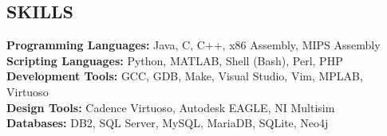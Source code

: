 \documentclass[line,margin]{res}
\begin{document}
\begin{resume}
		\section{SKILLS}
		\textbf{Programming Languages:} Java, C, C++, x86 Assembly, MIPS Assembly\\
		\textbf{Scripting Languages:} Python, MATLAB, Shell (Bash), Perl, PHP\\
		\textbf{Development Tools:} GCC, GDB, Make, Visual Studio, Vim, MPLAB, Virtuoso\\
		\textbf{Design Tools:} Cadence Virtuoso, Autodesk  EAGLE, NI Multisim\\
		\textbf{Databases:} DB2, SQL Server, MySQL, MariaDB, SQLite, Neo4j
		

	\end{resume}
\end{document}
